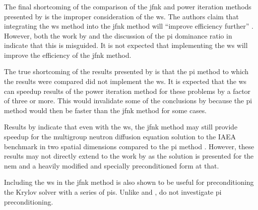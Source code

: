     \subsubsection{\texorpdfstring{}{Wielandt Shift}}
      The final shortcoming of the comparison of the \gls{jfnk} and power
      iteration methods presented by \citeauthor{qe2paper} is the improper
      consideration of the \gls{ws}. The authors claim that integrating the
      \gls{ws} method into the \gls{jfnk} method will ``improve efficiency
      further'' \cite{qe2paper}. However, both the work by
      \citeauthor{gill_azmy} and the discussion of the \gls{pi} dominance ratio
      in  indicate that this is misguided. It is not
      expected that implementing the \gls{ws} will improve the efficiency of the
      \gls{jfnk} method.

      The true shortcoming of the results presented by \citeauthor{qe2paper} is
      that the \gls{pi} method to which the results were compared did not
      implement the \gls{ws}. It is expected that the \gls{ws} can speedup
      results of the power iteration method for these problems by a factor of
      three or more. This would invalidate some of the conclusions by
      \citeauthor{qe2paper} because the \gls{pi} method would then be faster
      than the \gls{jfnk} method for some cases.

      Results by \citeauthor{jfnk_wielandt} indicate that even with the
      \gls{ws}, the \gls{jfnk} method may still provide speedup for the
      multigroup neutron diffusion equation solution to the IAEA benchmark in
      two spatial dimensions compared to the \gls{pi} method
      \cite{jfnk_wielandt}. However, these results may not directly extend to
      the work by \citeauthor{qe2paper} as the solution is presented for the
      \gls{nem} and a heavily modified and specially preconditioned form at
      that.

      Including the \gls{ws} in the \gls{jfnk} method is also shown to be useful
      for preconditioning the Krylov solver with a series of \glspl{pi}. Unlike
      \citeauthor{gill_azmy} and \citeauthor{jfnk_wielandt},
      \citeauthor{qe2paper} do not investigate \gls{pi} preconditioning.
